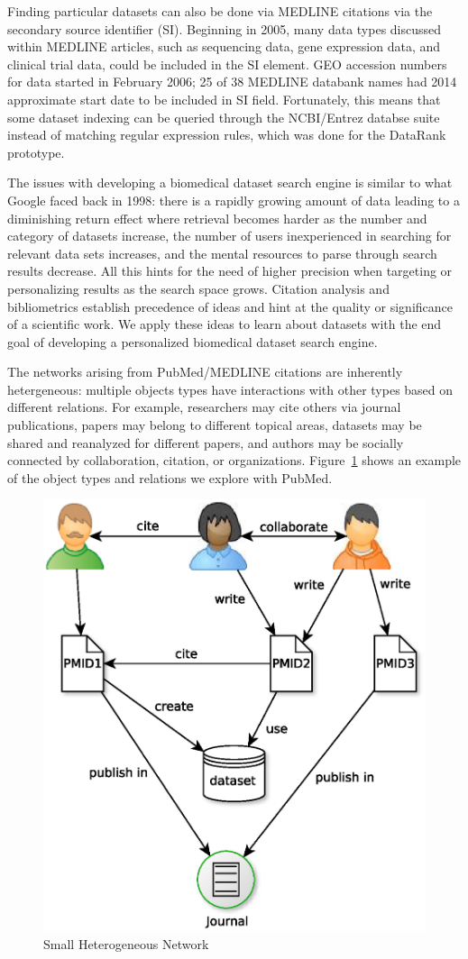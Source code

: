 Finding particular datasets can also be done via MEDLINE citations via the secondary source identifier (SI). Beginning in 2005, many data types discussed within MEDLINE articles, such as sequencing data, gene expression data, and clinical trial data, could be included in the SI element. GEO accession numbers for data started in February 2006; 25 of 38 MEDLINE databank names had 2014 approximate start date to be included in SI field. Fortunately, this means that some dataset indexing can be queried through the NCBI/Entrez databse suite instead of matching regular expression rules, which was done for the DataRank prototype.

The issues with developing a biomedical dataset search engine is similar to what Google faced back in 1998: there is a rapidly growing amount of data leading to a diminishing return effect where retrieval becomes harder as the number and category of datasets increase, the number of users inexperienced in searching for relevant data sets increases, and the mental resources to parse through search results decrease. All this hints for the need of higher precision when targeting or personalizing results as the search space grows. Citation analysis and bibliometrics establish precedence of ideas and hint at the quality or significance of a scientific work. We apply these ideas to learn about datasets with the end goal of developing a personalized biomedical dataset search engine. 

The networks arising from PubMed/MEDLINE citations are inherently hetergeneous: multiple objects types have interactions with other types based on different relations. For example, researchers may cite others via journal publications, papers may belong to different topical areas, datasets may be shared and reanalyzed for different papers, and authors may be socially connected by collaboration, citation, or organizations. Figure~\ref{fig:hetero} shows an example of the object types and relations we explore with PubMed.

\begin{figure}[h]
    \includegraphics[width=\columnwidth]{hetero.eps}
    \caption{Small Heterogeneous Network}
    \label{fig:hetero}
\end{figure}